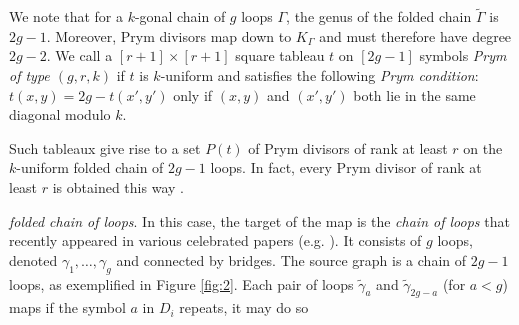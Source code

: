 \documentclass[11pt,reqno]{amsart}
\makeatletter
\newcommand*{\Z}{\mathbb{Z}}
\newcommand*{\abs}[1]{{\lvert #1 \rvert}}
\newcommand*{\ang}[1]{{\langle #1 \rangle}}
\newcommand*{\ti}[1]{\tilde{#1}}
\newcommand*{\wti}[1]{\widetilde{#1}}
\let\@@pmod\pmod
\DeclareRobustCommand{\pmod}{\@ifstar\@pmods\@@pmod}
\def\@pmods#1{\mkern4mu({\operator@font mod}\mkern 6mu#1)}
\DeclareMathOperator{\codim}{codim}
\theoremstyle{definition}
\theoremstyle{problem}
\theoremstyle{plain}
\theoremstyle{remark}
\theoremstyle{theorem}
\numberwithin{equation}{section}
\numberwithin{figure}{section}
\makeatother
\begin{document}
We note that for a $k$-gonal chain of $g$ loops $\Gamma$, the genus of
the folded chain $\wti \Gamma$ is $2g-1$.  Moreover, Prym divisors map
down to $K_\Gamma$ and must therefore have degree $2g-2$. We call a
$[r+1]\times [r+1]$ square tableau $t$ on $[2g-1]$ symbols \emph{Prym
  of type $(g,r,k)$} if $t$ is $k$-uniform and satisfies the following
\textit{Prym condition}: $t(x,y)=2g - t(x',y')$ only if $(x,y)$ and
$(x',y')$ both lie in the same diagonal modulo $k$.

Such tableaux give rise to a set $P(t)$ 
of Prym divisors of rank at least $r$ on
the $k$-uniform folded chain of $2g-1$ loops. In fact, every
Prym divisor of rank at least $r$ is obtained this way \cite[Corollary
5.3.10]{len2019skeletons}. 






\emph{folded chain of loops}. In this case, the target of the map is
the \emph{chain of loops} that recently appeared in various celebrated
papers (e.g. \cite{MRC, Pflueger, JR}). It consists of $g$ loops,
denoted  $\gamma_1,\ldots,\gamma_g$ and connected by bridges. The
source graph is a chain of $2g-1$ loops, as exemplified in Figure
\ref{fig:2}.  Each pair of loops $\ti\gamma_a$ and $\ti\gamma_{2g-a}$
(for $a<g$) maps  if the symbol $a$ in $D_i$ repeats, it may do so
\end{document}
